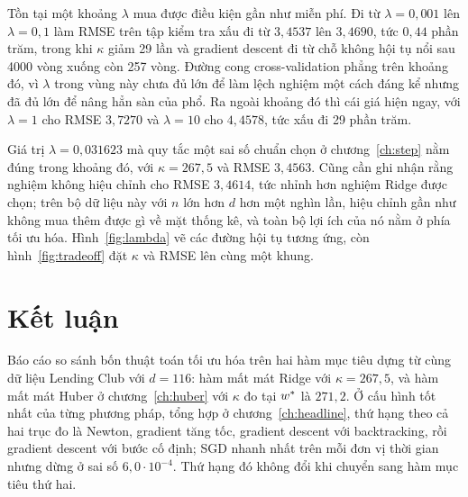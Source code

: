 \documentclass[12pt, a4paper, oneside]{report}
\theoremstyle{definition}
\begin{document}
Tồn tại một khoảng $\lambda$ mua được điều kiện gần như miễn phí. Đi từ
$\lambda = 0{,}001$ lên $\lambda = 0{,}1$ làm RMSE trên tập kiểm tra xấu đi từ
$3{,}4537$ lên $3{,}4690$, tức $0{,}44$ phần trăm, trong khi $\kappa$ giảm 29 lần
và gradient descent đi từ chỗ không hội tụ nổi sau \num{4000} vòng xuống còn 257
vòng. Đường cong cross-validation phẳng trên khoảng đó, vì $\lambda$ trong vùng này chưa
đủ lớn để làm lệch nghiệm một cách đáng kể nhưng đã đủ lớn để nâng hẳn sàn của
phổ. Ra ngoài khoảng đó thì cái giá hiện ngay, với $\lambda = 1$ cho
RMSE $3{,}7270$ và $\lambda = 10$ cho $4{,}4578$, tức xấu đi 29 phần trăm.

Giá trị $\lambda = 0{,}031623$ mà quy tắc một sai số chuẩn chọn ở
chương~\ref{ch:step} nằm đúng trong khoảng đó, với $\kappa = 267{,}5$ và RMSE
$3{,}4563$. Cũng cần ghi nhận rằng nghiệm không hiệu chỉnh cho RMSE $3{,}4614$,
tức nhỉnh hơn nghiệm Ridge được chọn; trên bộ dữ liệu này với $n$ lớn hơn $d$ hơn
một nghìn lần, hiệu chỉnh gần như không mua thêm được gì về mặt thống kê, và toàn
bộ lợi ích của nó nằm ở phía tối ưu hóa. Hình~\ref{fig:lambda} vẽ các đường hội tụ
tương ứng, còn hình~\ref{fig:tradeoff} đặt $\kappa$ và RMSE lên cùng một khung.



\chapter{Kết luận}

Báo cáo so sánh bốn thuật toán tối ưu hóa trên hai hàm mục tiêu dựng từ cùng dữ
liệu Lending Club với $d = 116$: hàm mất mát Ridge với $\kappa = 267{,}5$, và hàm
mất mát Huber ở chương~\ref{ch:huber} với $\kappa$ đo tại $w^{*}$ là $271{,}2$. Ở
cấu hình tốt nhất của từng phương pháp, tổng hợp ở chương~\ref{ch:headline}, thứ
hạng theo cả hai trục đo là Newton, gradient tăng tốc,
gradient descent với backtracking, rồi gradient descent với bước cố định; SGD
nhanh nhất trên mỗi đơn vị thời gian nhưng dừng ở sai số $6{,}0 \cdot 10^{-4}$.
Thứ hạng đó không đổi khi chuyển sang hàm mục tiêu thứ hai.
\end{document}
